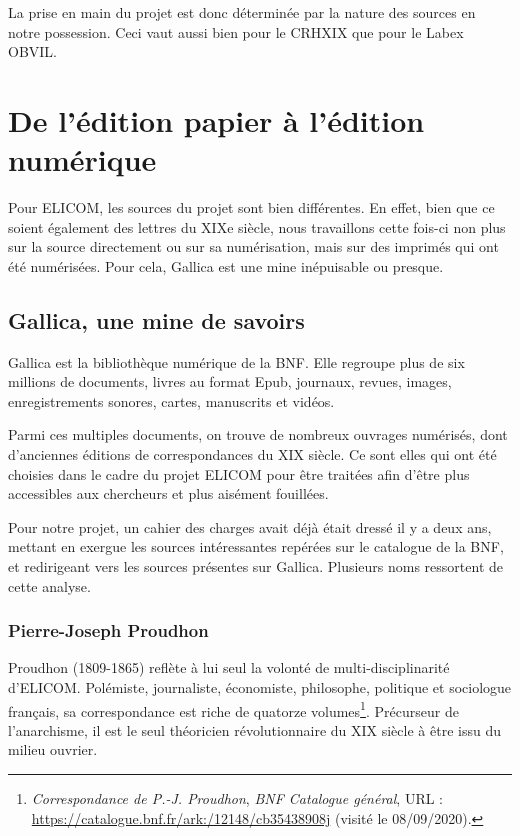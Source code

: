 La prise en main du projet est donc déterminée par la nature des sources en notre possession. Ceci vaut aussi bien pour le CRHXIX que pour le Labex OBVIL.





\section{De l'édition papier à l'édition numérique}

Pour ELICOM, les sources du projet sont bien différentes. En effet, bien que ce soient également des lettres du XIX{e} siècle, nous travaillons cette fois-ci non plus sur la source directement ou sur sa numérisation, mais sur des imprimés qui ont été numérisées. Pour cela, Gallica est une mine inépuisable ou presque.

\subsection{Gallica, une mine de savoirs}

Gallica est la bibliothèque numérique de la BNF. Elle regroupe plus de six millions de documents, livres au format Epub, journaux, revues, images, enregistrements sonores, cartes, manuscrits et vidéos. 

Parmi ces multiples documents, on trouve de nombreux ouvrages numérisés, dont d'anciennes éditions de correspondances du XIX siècle. Ce sont elles qui ont été choisies dans le cadre du projet ELICOM pour être traitées afin d'être plus accessibles aux chercheurs et plus aisément fouillées. 

Pour notre projet, un cahier des charges avait déjà était dressé il y a deux ans, mettant en exergue les sources intéressantes repérées sur le catalogue de la BNF, et redirigeant vers les sources présentes sur Gallica. Plusieurs noms ressortent de cette analyse.

\subsubsection{Pierre-Joseph Proudhon}

Proudhon (1809-1865) reflète à lui seul la volonté de multi-disciplinarité d'ELICOM. Polémiste, journaliste, économiste, philosophe, politique et sociologue français, sa correspondance est riche de quatorze volumes\footnote{ \emph{Correspondance de P.-J. Proudhon}, \emph{BNF Catalogue général}, URL : \url{https://catalogue.bnf.fr/ark:/12148/cb35438908j} (visité le 08/09/2020).}. Précurseur de l'anarchisme, il est le seul théoricien révolutionnaire du XIX siècle à être issu du milieu ouvrier.\\

